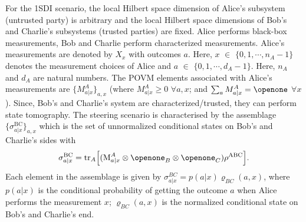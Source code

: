 \documentclass[reprint,superscriptaddress,nofootinbib,amsmath,amssymb,aps,pra,longbibliography]{revtex4-1}
\begin{document}
For the 1SDI scenario, the local Hilbert space dimension of Alice's subsystem (untrusted party) is arbitrary and the local Hilbert space dimensions of Bob's and Charlie's subsystems (trusted parties) are fixed. Alice performs black-box measurements, Bob and Charlie perform characterized measurements. Alice's measurements are denoted by $X_x$ with outcomes $a$. Here, $x$ $\in$ $\{0,1, \cdots, n_A-1\}$ denotes the measurement choices of Alice and $a$ $\in$ $\{0, 1, \cdots, d_A-1\}$. Here,  $n_A$ and $d_A$ are natural numbers. The POVM elements associated with Alice's measurements are $\{M^A_{a|x}\}_{a,x}$ (where $M^A_{a|x} \geq 0$ $\forall a, x$; and $\sum_{a} M^A_{a|x} = \openone$ $\forall x$). Since, Bob's and Charlie's system are characterized/trusted, they can perform state tomography. The steering scenario is characterised by the assemblage  $\{\sigma^{\text{BC}}_{a|x}\}_{a,x}$ which is the set of unnormalized conditional states on Bob's and Charlie's sides with
\begin{equation}
	\sigma^{\text{BC}}_{a|x} = \text{tr}_A\Big[(\text{M}_{a|x}^{A} \otimes \openone_B \otimes \openone_C) \rho^{\text{ABC}} \Big]. %
	\label{assemblage1}
\end{equation}
Each element in the assemblage  is given by $\sigma^{BC}_{a|x}=p(a|x)\varrho_{BC}(a, x)$,  where $p(a|x)$ is the conditional probability of getting the outcome $a$ when Alice performs the measurement $x$; $\varrho_{BC}(a, x)$ is the normalized conditional state on Bob's and Charlie's end.
\end{document}
